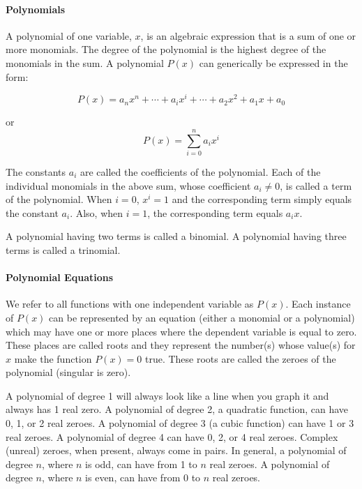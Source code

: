 \paragraph{Polynomials}



A polynomial of one variable, $x$, is an algebraic expression that is a sum of one or more monomials. The degree of the polynomial is the highest degree of the monomials in the sum. A polynomial $P(x)$ can generically be expressed in the form:



$$P(x) = a_n x^n + \cdots + a_i x^i + \cdots + a_2 x^2 + a_1 x + a_0$$





or
$$
P(x) = \sum_{i=0}^n a_i x^i$$







The constants $a_i$ are called the coefficients of the polynomial. Each of the individual monomials in the above sum, whose coefficient $a_i \neq 0$, is called a term of the polynomial. When $i = 0$, $x^i = 1$ and the corresponding term simply equals the constant $a_i$. Also, when $i = 1$, the corresponding term equals $a_i x$.



A polynomial having two terms is called a binomial. A polynomial having three terms is called a trinomial.



\paragraph{Polynomial Equations}



We refer to all functions with one independent variable as $P(x)$. Each instance of $P(x)$ can be represented by an equation (either a monomial or a polynomial) which may have one or more places where the dependent variable is equal to zero. These places are called roots and they represent the number(s) whose value(s) for $x$ make the function $P(x) = 0$ true. These roots are called the zeroes of the polynomial (singular is zero). 



A polynomial of degree 1 will always look like a line when you graph it and always has 1 real zero. A polynomial of degree 2, a quadratic function, can have 0, 1, or 2 real zeroes. A polynomial of degree 3 (a cubic function) can have 1 or 3 real zeroes. A polynomial of degree 4 can have 0, 2, or 4 real zeroes. Complex (unreal) zeroes, when present, always come in pairs. In general, a polynomial of degree $n$, where $n$ is odd, can have from 1 to $n$ real zeroes. A polynomial of degree $n$, where $n$ is even, can have from 0 to $n$ real zeroes.



